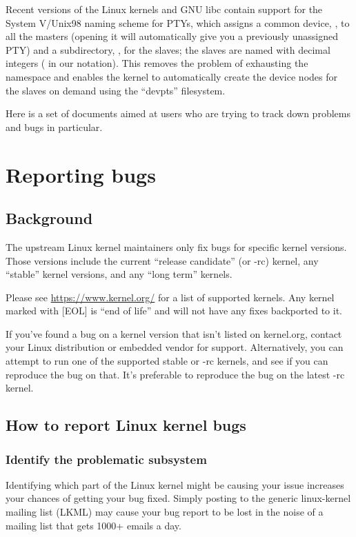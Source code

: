 \documentclass[a4paper,8pt,english]{sphinxmanual}
\begin{document}
Recent versions of the Linux kernels and GNU libc contain support for
the System V/Unix98 naming scheme for PTYs, which assigns a common
device, , to all the masters (opening it will automatically
give you a previously unassigned PTY) and a subdirectory, ,
for the slaves; the slaves are named with decimal integers (
in our notation).  This removes the problem of exhausting the
namespace and enables the kernel to automatically create the device
nodes for the slaves on demand using the ``devpts'' filesystem.

Here is a set of documents aimed at users who are trying to track down
problems and bugs in particular.


\chapter{Reporting bugs}
\label{admin-guide/reporting-bugs:reporting-bugs}\label{admin-guide/reporting-bugs:reportingbugs}\label{admin-guide/reporting-bugs::doc}

\section{Background}
\label{admin-guide/reporting-bugs:background}
The upstream Linux kernel maintainers only fix bugs for specific kernel
versions.  Those versions include the current ``release candidate'' (or -rc)
kernel, any ``stable'' kernel versions, and any ``long term'' kernels.

Please see \href{https://www.kernel.org/}{https://www.kernel.org/} for a list of supported kernels.  Any
kernel marked with {[}EOL{]} is ``end of life'' and will not have any fixes
backported to it.

If you've found a bug on a kernel version that isn't listed on kernel.org,
contact your Linux distribution or embedded vendor for support.
Alternatively, you can attempt to run one of the supported stable or -rc
kernels, and see if you can reproduce the bug on that.  It's preferable
to reproduce the bug on the latest -rc kernel.


\section{How to report Linux kernel bugs}
\label{admin-guide/reporting-bugs:how-to-report-linux-kernel-bugs}

\subsection{Identify the problematic subsystem}
\label{admin-guide/reporting-bugs:identify-the-problematic-subsystem}
Identifying which part of the Linux kernel might be causing your issue
increases your chances of getting your bug fixed. Simply posting to the
generic linux-kernel mailing list (LKML) may cause your bug report to be
lost in the noise of a mailing list that gets 1000+ emails a day.
\end{document}

